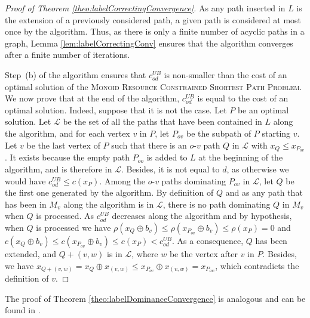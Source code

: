 \documentclass[11pt]{amsart}
\theoremstyle{plain}
\theoremstyle{remark}
\newcommand{\MRCSP}{\textsc{Monoid Resource Constrained Shortest Path Problem}\xspace}
\newcommand{\rplus}{\oplus}
\newcommand{\rleq}{\leqslant}
\newcommand{\rcost}{c}
\newcommand{\rmeas}{\rho}
\newcommand{\re}{x}
\begin{document}
\begin{proof}[Proof of Theorem \ref{theo:labelCorrectingConvergence}]
As any path inserted in $L$ is the extension of a previously considered path, a given path is considered at most once by the algorithm. Thus, as there is only a finite number of acyclic paths in a graph, Lemma \ref{lem:labelCorrectingConv} ensures that the algorithm converges after a finite number of iterations.


Step~(b) of the algorithm ensures that $c_{od}^{UB}$ is non-smaller than the cost of an optimal solution of the \MRCSP. We now prove that at the end of the algorithm, $c_{od}^{UB}$ is equal to the cost of an optimal solution. Indeed, suppose that it is not the case. Let $P$ be an optimal solution. Let $\mathcal{L}$ be the set of all the paths that have been contained in $L$ along the algorithm, and for each vertex $v$ in $P$, let $P_{ov}$ be the subpath of $P$ starting  $v$. Let $v$ be the last vertex of $P$ such that there is an $o$-$v$ path $Q$ in $\mathcal{L}$ with $\re_{Q} \rleq \re_{P_{ov}}$. It exists because the empty path $P_{oo}$ is added to $L$ at the beginning of the algorithm, and is therefore in $\mathcal{L}$. Besides, it is not equal to $d$, as otherwise we would have $c_{od}^{UB} \leq \rcost(\re_{P})$. Among the $o$-$v$ paths dominating $P_{ov}$ in $\mathcal{L}$, let $Q$ be the first one generated by the algorithm. 
By definition of $Q$ and as any path that has been in $M_{v}$ along the algorithm is in $\mathcal{L}$, there is no path dominating $Q$ in $M_{v}$ when $Q$ is processed. 
As $c_{od}^{UB}$ decreases along the algorithm and by hypothesis, when $Q$ is processed we have $\rmeas(\re_{Q} \rplus b_{v}) \leq \rmeas(\re_{P_{ov}} \rplus b_{v}) \leq \rmeas(\re_{P}) = 0$ and $\rcost(\re_{Q} \rplus b_{v}) \leq \rcost(\re_{P_{ov}} \rplus b_{v}) \leq \rcost(\re_{P}) < c_{od}^{UB}$. As a consequence, $Q$ has been extended, and $Q + (v,w)$ is in $\mathcal{L}$, where $w$ be the vertex after $v$ in $P$. Besides, we have $\re_{Q + (v,w)} = \re_{Q} \rplus \re_{(v,w)}\rleq \re_{P_{ov}} \rplus \re_{(v,w)} = \re_{P_{ow}}$, which contradicts the definition of $v$.
\end{proof}

The proof of Theorem \ref{theo:labelDominanceConvergence} is analogous and can be found in \cite{parmentier2016thesis}.
\end{document}
